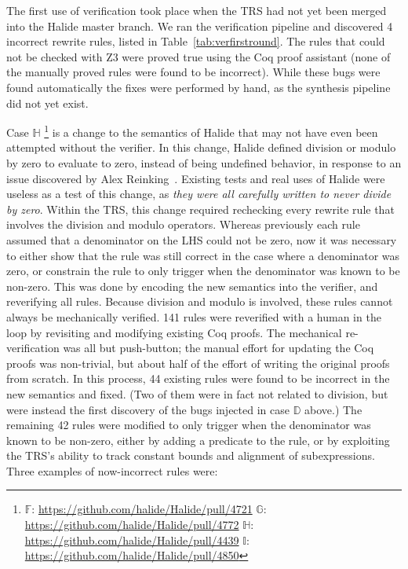 \documentclass[acmsmall]{acmart}\settopmatter{}
\newcommand{\NumRulesFixed}{{\color{black} 4}\xspace}
\newcommand{\NumZdivCoqProvedRules}{{\color{black} 141}\xspace}
\newcommand{\NumZdivFalseRules}{{\color{black} 44}\xspace}
\begin{document}
The first use of verification took place when the TRS had not yet been merged into the Halide master branch. We ran the verification pipeline and discovered \NumRulesFixed incorrect rewrite rules, listed in Table~\ref{tab:verfirstround}. The rules that could not be checked with Z3 were proved true using the Coq proof assistant (none of the manually proved rules were found to be incorrect). While these bugs were found automatically the fixes were performed by hand, as the synthesis pipeline did not yet exist. 

Case $\mathbb{H}$
\footnote{
\label{footnote:casesfi}
$\mathbb{F}$: \url{https://github.com/halide/Halide/pull/4721}
$\mathbb{G}$: \url{https://github.com/halide/Halide/pull/4772}
$\mathbb{H}$: \url{https://github.com/halide/Halide/pull/4439} %
$\mathbb{I}$: \url{https://github.com/halide/Halide/pull/4850}
}
is a change to the semantics of Halide that may not have even been attempted without the verifier. In this change, Halide defined division or modulo by zero to evaluate to zero, instead of being undefined behavior, in response to an issue discovered by Alex Reinking~\cite{reinkingthesis}. Existing tests and real uses of Halide were useless as a test of this change, as \emph{they were all carefully written to never divide by zero}. Within the TRS, this change required rechecking every rewrite rule that involves the division and modulo operators. Whereas previously each rule assumed that a denominator on the LHS could not be zero, now it was necessary to either show that the rule was still correct in the case where a denominator was zero, or constrain the rule to only trigger when the denominator was known to be non-zero. This was done by encoding the new semantics into the verifier, and reverifying all rules. Because division and modulo is involved, these rules cannot always be mechanically verified. 
\NumZdivCoqProvedRules rules were reverified with a human in the loop by revisiting and modifying existing Coq proofs. The mechanical re-verification was all but push-button; the manual effort for updating the Coq proofs was non-trivial, but about half of the effort of writing the original proofs from scratch. In this process, \NumZdivFalseRules existing rules were found to be incorrect in the new semantics and fixed. (Two of them were in fact not related to division, but were instead the first discovery of the bugs injected in case $\mathbb{D}$ above.) The remaining 42 rules were modified to only trigger when the denominator was known to be non-zero, either by adding a predicate to the rule, or by exploiting the TRS’s ability to track constant bounds and alignment of subexpressions. Three examples of now-incorrect rules were:
\end{document}
